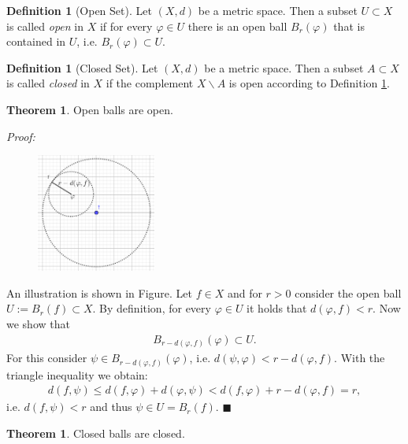 \documentclass[12pt, a4paper]{article}
\numberwithin{equation}{section}
\theoremstyle{definition}
\theoremstyle{definition}
\newtheorem{defn}[thm]{Definition} %
\newtheorem{theorem}[thm]{Theorem}
\begin{document}
	\begin{defn}[Open Set]
		\label{defn-open-set}
		Let $(X, d)$ be a metric space. Then a subset $U\subset X$ is called \textit{open} in $X$ if for every $\varphi \in U$ there is an open ball $B_{r}(\varphi)$ that is contained in $U$, i.e. $B_r(\varphi)\subset U$. 
	\end{defn}

	\begin{defn}[Closed Set]
		Let $(X, d)$ be a metric space. Then a subset $A\subset X$ is called \textit{closed} in $X$ if the complement $X\backslash A$ is open according to Definition \ref{defn-open-set}. 
	\end{defn}

	\begin{theorem}\label{open-balls-open}
		Open balls are open. 
	\end{theorem}
	\noindent\textit{Proof:}
	\begin{figure}[h!]
		\centering
		\includegraphics[width=0.35\textwidth]{Figures/open-balls-open.png}
	\end{figure}
	An illustration is shown in Figure. Let $f\in X$ and for $r > 0$ consider the open ball $U:= B_{r}(f) \subset X$. By definition, for every $\varphi \in U$ it holds that $d\left(\varphi, f\right) < r$. Now we show that 
	\begin{align}
		B_{r-d\left(\varphi, f\right)}(\varphi) \subset U.
	\end{align}
	For this consider $\psi\in B_{r-d\left(\varphi, f\right)}(\varphi)$, i.e. $d(\psi, \varphi) < r - d(\varphi, f)$. With the triangle inequality we obtain: 
	\begin{align}
		d(f, \psi) \leq d(f, \varphi) + d(\varphi, \psi) < d(f, \varphi) + r - d(\varphi, f) = r,  		
	\end{align}
	i.e. $d(f, \psi) < r$ and thus $\psi\in U = B_{r}(f)$.  \qquad\qquad\qquad\qquad\qquad\qquad\qquad\qquad\qquad\qquad\qquad\qquad\qquad\quad$\blacksquare$
	
	\begin{theorem}\label{thrm:closed_balls_open}
		Closed balls are closed.
	\end{theorem}
	
\end{document}
